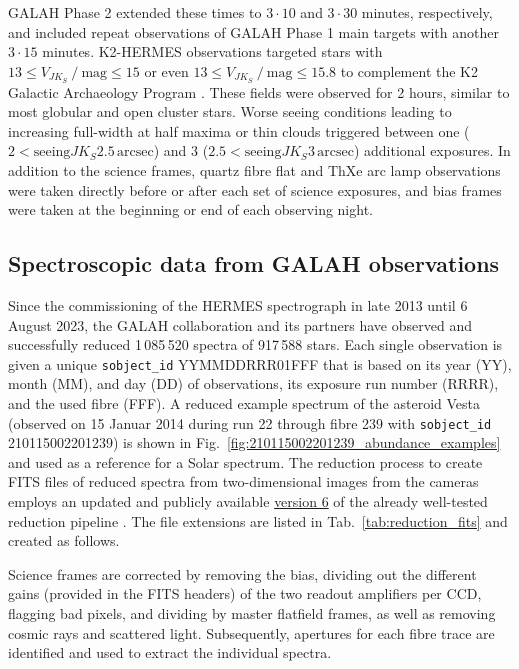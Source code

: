 \documentclass[
  journal=pasa,
  manuscript=research-paper, %
  year=2024,
  volume=37
]{cup-journal}
\newcommand{\allstarnumber}{917\,588\xspace}
\newcommand{\allspecnumber}{1\,085\,520\xspace}
\begin{document}
GALAH Phase 2 extended these times to $3 \cdot 10$ and $3 \cdot 30$ minutes, respectively, and included repeat observations of GALAH Phase 1 main targets with another $3 \cdot 15$ minutes. K2-HERMES observations targeted stars with $13 \leq V_{JK_S}~/~\mathrm{mag} \leq 15$ or even $13 \leq V_{JK_S}~/~\mathrm{mag} \leq 15.8$ to complement the K2 Galactic Archaeology Program \citep{Stello2015}. These fields were observed for 2 hours, similar to most globular and open cluster stars. Worse seeing conditions leading to increasing full-width at half maxima or thin clouds triggered between one ($2 < \mathrm{seeing}{JK_S}2.5\,\mathrm{arcsec}$) and 3 ($2.5 < \mathrm{seeing}{JK_S}3\,\mathrm{arcsec}$) additional exposures. In addition to the science frames, quartz fibre flat and ThXe arc lamp observations were taken directly before or after each set of science exposures, and bias frames were taken at the beginning or end of each observing night.

\subsection{Spectroscopic data from GALAH observations}
\label{sec:spectroscopic_data_from_galah_observations}

Since the commissioning of the HERMES spectrograph in late 2013 until 6 August 2023, the GALAH collaboration and its partners have observed and successfully reduced \allspecnumber spectra of \allstarnumber stars. Each single observation is given a unique \texttt{sobject\_id} YYMMDDRRR01FFF that is based on its year (YY), month (MM), and day (DD) of observations, its exposure run number (RRRR), and the used fibre (FFF). A reduced example spectrum of the asteroid Vesta (observed on 15 Januar 2014 during run 22 through fibre 239 with \texttt{sobject\_id} 210115002201239) is shown in Fig.~\ref{fig:210115002201239_abundance_examples} and used as a reference for a Solar spectrum. The reduction process to create FITS files of reduced spectra from two-dimensional images from the cameras employs an updated and publicly available \href{https://github.com/sheliak/galah_reduction/blob/master/extract6.0.py}{version 6} of the already well-tested reduction pipeline \citep{Kos2017}. The file extensions are listed in Tab.~\ref{tab:reduction_fits} and created as follows.

Science frames are corrected by removing the bias, dividing out the different gains (provided in the FITS headers) of the two readout amplifiers per CCD, flagging bad pixels, and dividing by master flatfield frames, as well as removing cosmic rays and scattered light. Subsequently, apertures for each fibre trace are identified and used to extract the individual spectra. 
\end{document}
